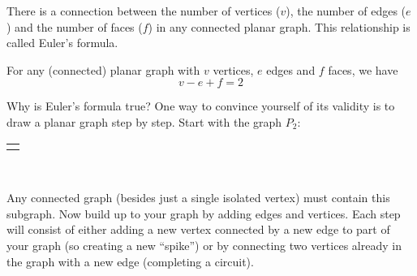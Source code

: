 \documentclass[12pt,]{book}
\theoremstyle{plain}
\theoremstyle{definition}
\theoremstyle{definition}
\theoremstyle{definition}
\numberwithin{equation}{chapter}
\newlength{\panelmax}
\newcommand{\vtx}[2]{node[fill,circle,inner sep=0pt, minimum size=4pt,label=#1:#2]{}}
\renewcommand{\v}{\vtx{above}{}}
\begin{document}
\par
\hypertarget{p-1630}{}%
There is a connection between the number of vertices (\(v\)), the number of edges (\(e\)) and the number of faces (\(f\)) in any connected planar graph. This relationship is called Euler's formula.%
\begin{assemblage}\label{assemblage-40}
\hypertarget{p-1631}{}%
 For any (connected) planar graph with \(v\) vertices, \(e\) edges and \(f\) faces, we have%
\begin{equation*}
v-e + f = 2
\end{equation*}
%
\end{assemblage}
\hypertarget{p-1632}{}%
Why is Euler's formula true? One way to convince yourself of its validity is to draw a planar graph step by step. Start with the graph \(P_2\):%
{%
\setlength{\panelmax}{0pt}
\ifdefined\panelboxAimage\else\newsavebox{\panelboxAimage}\fi%
\begin{lrbox}{\panelboxAimage}
\resizebox{0.1\linewidth}{!}{{
\begin{tikzpicture}
      \draw (-.5,-.5) \v -- (.5,.5)\v;
    \end{tikzpicture}
}
}\end{lrbox}
\ifdefined\phAimage\else\newlength{\phAimage}\fi%
\setlength{\phAimage}{\ht\panelboxAimage+\dp\panelboxAimage}
\settototalheight{\phAimage}{\usebox{\panelboxAimage}}
\setlength{\panelmax}{\maxof{\panelmax}{\phAimage}}
\leavevmode%
\setlength{\tabcolsep}{0\linewidth}
\par\medskip\noindent
\hspace*{0.45\linewidth}%
\begin{tabular}{@{}*{1}{c}@{}}
\begin{minipage}[c][\panelmax][t]{0.1\linewidth}\usebox{\panelboxAimage}\end{minipage}\end{tabular}\\
}%
\par
\hypertarget{p-1633}{}%
Any connected graph (besides just a single isolated vertex) must contain this subgraph. Now build up to your graph by adding edges and vertices. Each step will consist of either adding a new vertex connected by a new edge to part of your graph (so creating a new ``spike'') or by connecting two vertices already in the graph with a new edge (completing a circuit).%
\end{document}
